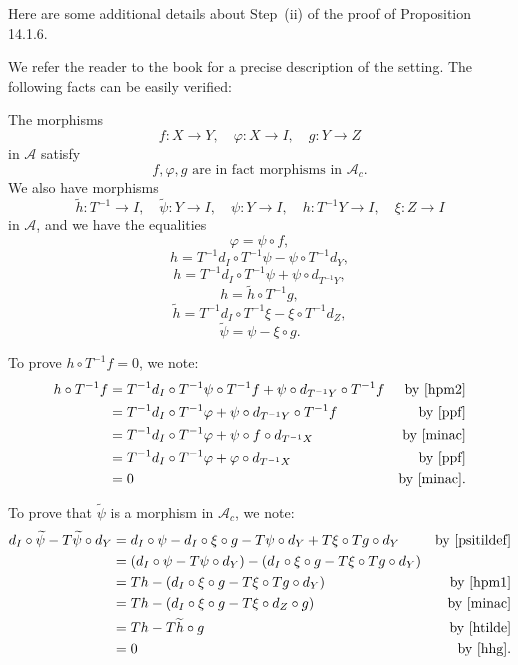 \documentclass[12pt]{article}
\theoremstyle{remark}
\theoremstyle{definition}
\newcommand{\A}{\mathcal A}
\newcommand{\pp}{\varphi}
\begin{document}
Here are some additional details about Step~(ii) of the proof of Proposition 14.1.6. 

We refer the reader to the book for a precise description of the setting. The following facts can be easily verified: 

The morphisms 
$$
f:X\to Y,\quad\pp:X\to I,\quad g:Y\to Z
$$ 
in $\A$ satisfy 
%
\begin{equation}\label{minac}
f,\pp,g\text{ are in fact morphisms in }\A_c.
\end{equation}
%
We also have morphisms 
$$
\widetilde h:T^{-1}\to I,\quad\widetilde\psi:Y\to I,\quad\psi:Y\to I,\quad h:T^{-1}Y\to I,\quad\xi:Z\to I
$$ 
in $\A$, and we have the equalities 
%
\begin{equation}\label{ppf}
\pp=\psi\circ f,
\end{equation}
%
\begin{equation}\label{hpm1}
h=T^{-1}d_I\circ T^{-1}\psi-\psi\circ T^{-1}d_Y,
\end{equation}
%
\begin{equation}\label{hpm2}
h=T^{-1}d_I\circ T^{-1}\psi+\psi\circ d_{T^{-1}Y},
\end{equation}
%
\begin{equation}\label{hhg}
h=\widetilde h\circ T^{-1}g,
\end{equation}
%
\begin{equation}\label{htilde}
\widetilde h=T^{-1}d_I\circ T^{-1}\xi-\xi\circ T^{-1}d_Z,
\end{equation}
%
\begin{equation}\label{psitildef}
\widetilde\psi=\psi-\xi\circ g. 
\end{equation}

To prove $h\circ T^{-1}f=0$, we note: 
%
\begin{align*}
h\circ T^{-1}f&=T^{-1}d_I\circ T^{-1}\psi\circ T^{-1}f+\psi\circ d_{T^{-1}Y}\circ T^{-1}f&\text{by \eqref{hpm2}}\\ 
&=T^{-1}d_I\circ T^{-1}\pp+\psi\circ d_{T^{-1}Y}\circ T^{-1}f&\text{by \eqref{ppf}}\\ 
&=T^{-1}d_I\circ T^{-1}\pp+\psi\circ f\circ d_{T^{-1}X}&\text{by \eqref{minac}}\\ 
&=T^{-1}d_I\circ T^{-1}\pp+\pp\circ d_{T^{-1}X}&\text{by \eqref{ppf}}\\ 
&=0&\text{by \eqref{minac}}. 
\end{align*}

To prove that $\widetilde\psi$ is a morphism in $\A_c$, we note: 
%
\begin{align*}
d_I\circ\widetilde\psi-T\widetilde\psi\circ d_Y&=d_I\circ\psi-d_I\circ\xi\circ g-T\psi\circ d_Y+T\xi\circ Tg\circ d_Y&\text{by \eqref{psitildef}}\\ 
&=(d_I\circ\psi-T\psi\circ d_Y)-(d_I\circ\xi\circ g-T\xi\circ Tg\circ d_Y)\\ 
&=Th-(d_I\circ\xi\circ g-T\xi\circ Tg\circ d_Y)&\text{by \eqref{hpm1}}\\ 
&=Th-(d_I\circ\xi\circ g-T\xi\circ d_Z\circ g)&\text{by \eqref{minac}}\\ 
&=Th-T\widetilde h\circ g&\text{by \eqref{htilde}}\\ 
&=0&\text{by \eqref{hhg}}. 
\end{align*}
\end{document}
